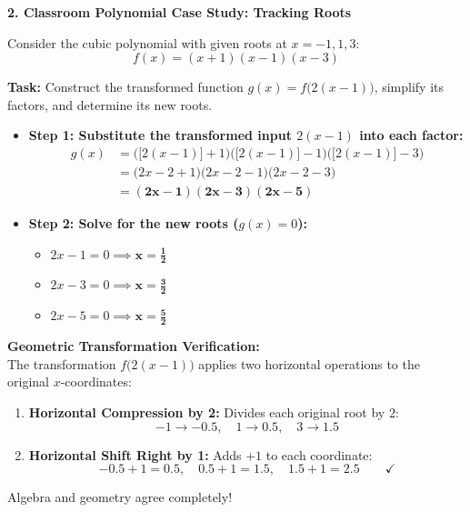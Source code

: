 \documentclass[10.5pt]{article}
\begin{document}
\textbf{\large 2. Classroom Polynomial Case Study: Tracking Roots}

Consider the cubic polynomial with given roots at $x = -1, 1, 3$:
\[
  f(x) = (x + 1)(x - 1)(x - 3)
\]

\textbf{Task:} Construct the transformed function $g(x) = f\big(2(x - 1)\big)$, simplify its factors, and determine its new roots.

\begin{itemize}[leftmargin=1.2em, topsep=1pt, itemsep=4pt]
  \item \textbf{Step 1: Substitute the transformed input $2(x - 1)$ into each factor:}
  \begin{align*}
    g(x) &= \Big(\big[2(x - 1)\big] + 1\Big)\Big(\big[2(x - 1)\big] - 1\Big)\Big(\big[2(x - 1)\big] - 3\Big) \\
         &= \big(2x - 2 + 1\big)\big(2x - 2 - 1\big)\big(2x - 2 - 3\big) \\
         &= \mathbf{(2x - 1)(2x - 3)(2x - 5)}
  \end{align*}

  \item \textbf{Step 2: Solve for the new roots ($g(x) = 0$):}
  \begin{itemize}[label=--]
    \item $2x - 1 = 0 \implies \mathbf{x = \frac{1}{2}}$
    \item $2x - 3 = 0 \implies \mathbf{x = \frac{3}{2}}$
    \item $2x - 5 = 0 \implies \mathbf{x = \frac{5}{2}}$
  \end{itemize}
\end{itemize}

\vspace{0.04in}

\begin{tcolorbox}[colback=chalkblue!6, colframe=chalkblue, boxrule=1pt, arc=3pt, left=8pt, right=8pt, top=4pt, bottom=4pt]
\textbf{Geometric Transformation Verification:}\\[2pt]
The transformation $f\big(2(x - 1)\big)$ applies two horizontal operations to the original $x$-coordinates:
\begin{enumerate}[leftmargin=1.4em, topsep=1pt, itemsep=2pt]
  \item \textbf{Horizontal Compression by 2:} Divides each original root by $2$:
  \[
    -1 \to -0.5, \quad 1 \to 0.5, \quad 3 \to 1.5
  \]
  \item \textbf{Horizontal Shift Right by 1:} Adds $+1$ to each coordinate:
  \[
    -0.5 + 1 = \mathbf{0.5}, \quad 0.5 + 1 = \mathbf{1.5}, \quad 1.5 + 1 = \mathbf{2.5} \qquad \checkmark
  \]
\end{enumerate}
Algebra and geometry agree completely!
\end{tcolorbox}
\end{document}

